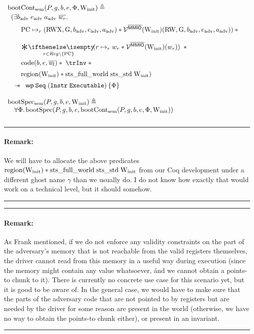 \documentclass{article}
\newcommand{\X}[1]{\ensuremath{\mathrm{#1}}}
\newcommand{\V}[1]{\ensuremath{\mathit{#1}}}
\newcommand{\I}[1]{\ensuremath{\mathtt{#1}}}
\DeclareMathOperator{\driverC}{code}
\newcommand{\bigast}[2]{\underset{#1}\Sep{\!\!\! #2}\;}
\newenvironment{remark}
{ \bigskip\hrule\vspace{-1.3em}\nobreak
  \paragraph*{Remark:}}
{\vspace*{0.5em}\hrule\medskip}
\begin{document}
\[\begin{array}{l}
 \X{bootCont_{sem}}(P, g, b, e, \Phi,\Winit) \eqdef  \\[0.2em]
    \begin{array}{l}
       (\exists b_{\X{adv}}\; e_{\X{adv}}\; a_{\X{adv}}\;\overline{w_r}.\; \\[0.5em]
      \quad
      \begin{array}{l}
        \X{PC} \mapsto_{r} (\X{RWX}, \X{G}, b_{\X{adv}}, e_{\X{adv}}, a_{\X{adv}})
        \ast \VR^{\notMMIO} (\Winit)(\X{RW}, \X{G}, b_{\X{adv}}, e_{\X{adv}}, a_{\X{adv}})) \ast {} \\[1.2em]
        \bigast{r \in Reg\setminus \{\X{PC}\}}{(r \mapsto_{r} w_r \ast
        \VR^{\notMMIO} (\Winit)(w_r))} \ast {} \\[1.2em]
        \driverC(b,e,\overline{\V{w}_l})\ast
        \; \trInv \; \ast \\[0.5em]
        \X{region}(\Winit) \ast  \X{sts\_full\_world}\; \X{sts\_std} \;
        \Winit)\\[0.5em]       \end{array}
    \end{array} \\[4em]
    \quad\wand
    \begin{array}{l}
     \wpre{\I{Seq}\; (\I{Instr}\; \I{Executable})}{\Phi}
    \end{array}\\[1.2em]

  \X{bootSpec_{sem}}(P, g, b, e, \Winit)
    \eqdef\\
     \quad \forall \Phi\ldotp  \X{bootSpec}(P, g, b, e,\X{bootCont_{sem}}(P, g, b, e, \Phi,\Winit))\\[0.8em]

  \end{array}
\]

\begin{remark}
  We will have to allocate the above predicates\\ $\X{region}(\Winit) \ast
  \X{sts\_full\_world}\; \X{sts\_std} \; \Winit$ from our Coq development under
  a different ghost name $\gamma$ than we usually do.
  I do not know how exactly that would work on a technical level, but it should somehow.
\end{remark}

\begin{remark}
As Frank mentioned, if we do not enforce any validity constraints on the part of the adversary's memory that is not reachable
from the valid registers themselves, the driver cannot read from this memory in
a useful way during execution (since the memory might contain any value
whatsoever, \'and we cannot obtain a points-to chunk to it).
There is currently no concrete use case for this scenario yet, but it is good to be aware of.
In the general case, we would have to make sure that the parts of the adversary
code that are not pointed to by registers but are needed by the driver for some
reason are present in the world (otherwise, we have no way to obtain the
points-to chunk either), or present in an invariant.
\end{remark}
\end{document}
